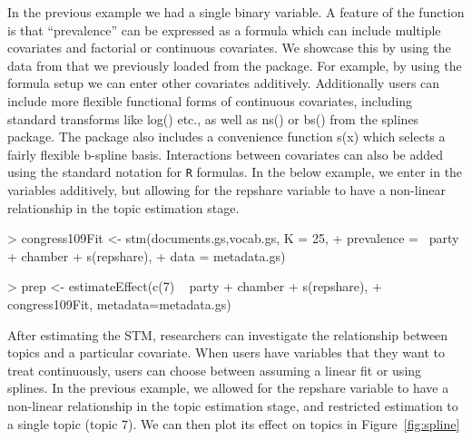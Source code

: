 \documentclass[nojss]{jss}
\begin{document}
In the previous example we had a single binary variable. A feature of the  function is that ``prevalence'' can be expressed as a formula which can include multiple covariates and factorial or continuous covariates. We showcase this by using the data from \citet{gentzkow2010drives} that we previously loaded from the  package. For example, by using the formula setup we can enter other covariates additively. Additionally users can include more flexible functional forms of continuous covariates, including standard transforms like log() etc., as well as ns() or bs() from the splines package. The  package also includes a convenience function s(x) which selects a fairly flexible b-spline basis. Interactions between covariates can also be added using the standard notation for \texttt{R} formulas. In the below example, we enter in the variables additively, but allowing for the repshare variable to have a non-linear relationship in the topic estimation stage.

\begin{Schunk}
\begin{Sinput}
> congress109Fit <- stm(documents.gs,vocab.gs, K = 25,
+                       prevalence = ~party + chamber + s(repshare),
+                       data = metadata.gs)
\end{Sinput}
\end{Schunk}

\begin{Schunk}
\begin{Sinput}
> prep <- estimateEffect(c(7) ~ party + chamber + s(repshare),
+         congress109Fit, metadata=metadata.gs)
\end{Sinput}
\end{Schunk}

After estimating the STM, researchers can investigate the relationship between topics and a particular covariate. When users have variables that they want to treat continuously, users can choose between assuming a linear fit or using splines. In the previous example, we allowed for the repshare variable to have a non-linear relationship in the topic estimation stage, and restricted estimation to a single topic (topic 7). We can then plot its effect on topics in Figure~\ref{fig:spline}
\end{document}
